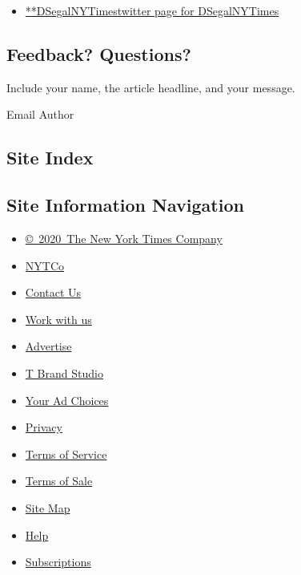 \begin{itemize}
\tightlist
\item
  \href{https://twitter.com/DSegalNYTimes}{**DSegalNYTimestwitter page
  for DSegalNYTimes}
\end{itemize}

\hypertarget{feedback-questions}{%
\subsection{Feedback? Questions?}\label{feedback-questions}}

Include your name, the article headline, and your message.

Email Author

\hypertarget{site-index}{%
\subsection{Site Index}\label{site-index}}

\hypertarget{site-information-navigation}{%
\subsection{Site Information
Navigation}\label{site-information-navigation}}

\begin{itemize}
\tightlist
\item
  \href{https://help.nytimes3xbfgragh.onion/hc/en-us/articles/115014792127-Copyright-notice}{©~2020~The
  New York Times Company}
\end{itemize}

\begin{itemize}
\tightlist
\item
  \href{https://www.nytco.com/}{NYTCo}
\item
  \href{https://help.nytimes3xbfgragh.onion/hc/en-us/articles/115015385887-Contact-Us}{Contact
  Us}
\item
  \href{https://www.nytco.com/careers/}{Work with us}
\item
  \href{https://nytmediakit.com/}{Advertise}
\item
  \href{http://www.tbrandstudio.com/}{T Brand Studio}
\item
  \href{https://www.nytimes3xbfgragh.onion/privacy/cookie-policy\#how-do-i-manage-trackers}{Your
  Ad Choices}
\item
  \href{https://www.nytimes3xbfgragh.onion/privacy}{Privacy}
\item
  \href{https://help.nytimes3xbfgragh.onion/hc/en-us/articles/115014893428-Terms-of-service}{Terms
  of Service}
\item
  \href{https://help.nytimes3xbfgragh.onion/hc/en-us/articles/115014893968-Terms-of-sale}{Terms
  of Sale}
\item
  \href{https://spiderbites.nytimes3xbfgragh.onion}{Site Map}
\item
  \href{https://help.nytimes3xbfgragh.onion/hc/en-us}{Help}
\item
  \href{https://www.nytimes3xbfgragh.onion/subscription?campaignId=37WXW}{Subscriptions}
\end{itemize}

